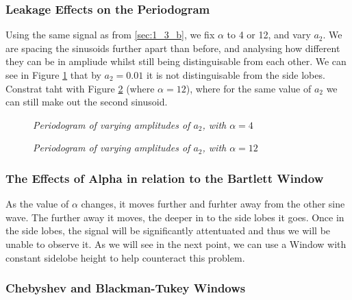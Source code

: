 \documentclass[./main.tex]{subfiles}
\begin{document}
\subsubsection{Leakage Effects on the Periodogram}

Using the same signal as from \ref{sec:1_3_b}, we fix $\alpha$ to 4 or 12, and vary $a_2$. We are spacing the sinusoids further apart than before, and analysing how different they can be in ampliude whilst still being distinguisable from each other. We can see in Figure \ref{fig:1_3_d_1} that by $ a_2 = 0.01 $ it is not distinguisable from the side lobes. Constrat taht with Figure \ref{fig:1_3_d_2} (where $ \alpha = 12$), where for the same value of $a_2$ we can still make out the second sinusoid.
	 
\begin{figure}[h]
	\centering 
	\resizebox{\textwidth}{!}{}
	\caption{\textit{Periodogram of varying amplitudes of $a_2$, with $\alpha=4$}}
	\label{fig:1_3_d_1}
\end{figure}

\begin{figure}[h]
	\centering 
	\resizebox{\textwidth}{!}{}
	\caption{\textit{Periodogram of varying amplitudes of $a_2$, with $\alpha=12$}}
	\label{fig:1_3_d_2}
\end{figure}

\subsubsection{The Effects of Alpha in relation to the Bartlett Window}
As the value of $ \alpha$ changes, it moves further and furhter away from the other sine wave. The further away it moves, the deeper in to the side lobes it goes. Once in the side lobes, the signal will be significantly attentuated and thus we will be unable to observe it. As we will see in the next point, we can use a Window with constant sidelobe height to help counteract this problem.

\subsubsection{Chebyshev and Blackman-Tukey Windows}
\end{document}
